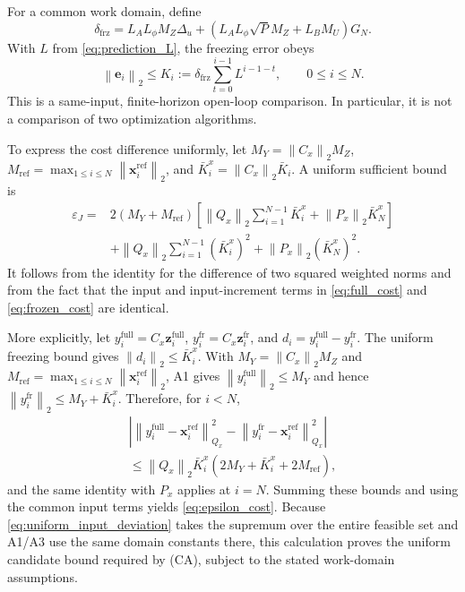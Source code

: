 ﻿\documentclass[journal]{IEEEtran}
\newcommand{\vx}{\mathbf{x}}
\newcommand{\vz}{\mathbf{z}}
\newcommand{\ve}{\mathbf{e}}
\newcommand{\norm}[1]{\left\lVert #1\right\rVert}
\begin{document}
For a common work domain, define
\begin{equation}
    \delta_{\mathrm{frz}}=L_AL_\phi M_Z\Delta_u
    +\left(L_AL_\phi\sqrt{P}M_Z+L_BM_U\right)G_N.
    \label{eq:freezing_driver}
\end{equation}
With $L$ from \eqref{eq:prediction_L}, the freezing error obeys
\begin{equation}
    \norm{\ve_i}_2\le K_i:=\delta_{\mathrm{frz}}
    \sum_{t=0}^{i-1}L^{i-1-t},\qquad 0\le i\le N.
    \label{eq:freezing_bound}
\end{equation}
This is a same-input, finite-horizon open-loop comparison. In particular, it is not a comparison of two optimization algorithms.

To express the cost difference uniformly, let $M_Y=\norm{C_x}_2M_Z$, $M_{\mathrm{ref}}=\max_{1\le i\le N}\norm{\vx_i^{\mathrm{ref}}}_2$, and $\bar K_i^x=\norm{C_x}_2\bar K_i$. A uniform sufficient bound is
\begin{align}
\varepsilon_J={}&2(M_Y+M_{\mathrm{ref}})
 \left[\norm{Q_x}_2\sum_{i=1}^{N-1}\bar K_i^x+\norm{P_x}_2\bar K_N^x\right]\\
&+\norm{Q_x}_2\sum_{i=1}^{N-1}(\bar K_i^x)^2+\norm{P_x}_2(\bar K_N^x)^2.
\label{eq:epsilon_cost}
\end{align}
It follows from the identity for the difference of two squared weighted norms and from the fact that the input and input-increment terms in \eqref{eq:full_cost} and \eqref{eq:frozen_cost} are identical.

More explicitly, let $y_i^{\mathrm{full}}=C_x\vz_i^{\mathrm{full}}$, $y_i^{\mathrm{fr}}=C_x\vz_i^{\mathrm{fr}}$, and $d_i=y_i^{\mathrm{full}}-y_i^{\mathrm{fr}}$. The uniform freezing bound gives $\norm{d_i}_2\le\bar K_i^x$. With $M_Y=\norm{C_x}_2M_Z$ and $M_{\mathrm{ref}}=\max_{1\le i\le N}\norm{\vx_i^{\mathrm{ref}}}_2$, A1 gives $\norm{y_i^{\mathrm{full}}}_2\le M_Y$ and hence $\norm{y_i^{\mathrm{fr}}}_2\le M_Y+\bar K_i^x$. Therefore, for $i<N$,
\begin{equation}
\begin{gathered}
\left|\norm{y_i^{\mathrm{full}}-\vx_i^{\mathrm{ref}}}_{Q_x}^2-
\norm{y_i^{\mathrm{fr}}-\vx_i^{\mathrm{ref}}}_{Q_x}^2\right|
\\
\le\norm{Q_x}_2\bar K_i^x(2M_Y+\bar K_i^x+2M_{\mathrm{ref}}),
\end{gathered}
\end{equation}
and the same identity with $P_x$ applies at $i=N$. Summing these bounds and using the common input terms yields \eqref{eq:epsilon_cost}. Because \eqref{eq:uniform_input_deviation} takes the supremum over the entire feasible set and A1/A3 use the same domain constants there, this calculation proves the uniform candidate bound required by (CA), subject to the stated work-domain assumptions.
\end{document}
